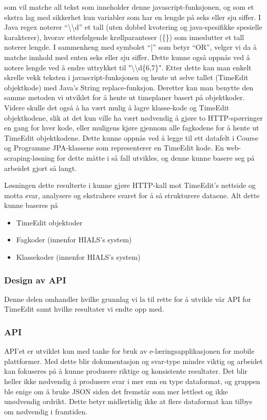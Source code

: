 \documentclass[../main.tex]{subfiles}
\begin{document}
som vil matche all tekst som inneholder denne javascript-funksjonen, og som et ekstra lag med sikkerhet kun variabler som har en lengde på seks eller sju siffer. I Java regex noterer “\textbackslash \textbackslash d” et tall (uten dobbel kvotering og java-spesifikke spesielle karakterer), hvorav etterfølgende krøllparanteser (\{\}) som inneslutter et tall noterer lengde. I sammenheng med symbolet “|” som betyr “OR”, velger vi da å matche innhold med enten seks eller sju siffer. Dette kunne også oppnås ved å notere lengde ved å endre uttrykket til "\textbackslash \textbackslash d\{6,7\}". \newline
Etter dette kan man enkelt skrelle vekk teksten i javascript-funksjonen og hente ut selve tallet (TimeEdit objektkode) med Java’s String replace-funksjon.
Deretter kan man benytte den samme metoden vi utviklet for å hente ut timeplaner basert på objektkoder. Videre skulle det også å ha vært mulig å lagre klasse-kode og TimeEdit objektkodene, slik at det kun ville ha vært nødvendig å gjøre to HTTP-spørringer en gang for hver kode, eller muligens kjøre gjennom alle fagkodene for å hente ut TimeEdit objektkodene. Dette kunne oppnås ved å legge til ett datafelt i Course og Programme JPA-klassene som representerer en TimeEdit kode. En web-scraping-løsning for dette måtte i så fall utvikles, og denne kunne basere seg på arbeidet gjort så langt.\newline

Løsningen dette resulterte i kunne gjøre HTTP-kall mot TimeEdit's nettside og motta svar, analysere og ekstrahere svaret for å så strukturere dataene. Alt dette kunne baseres på 
\begin{itemize}
\item TimeEdit objektoder
\item Fagkoder (innenfor HIALS's system)
\item Klassekoder (innenfor HIALS's system)
\end{itemize}

\newpage

\subsubsection{Design av API}
Denne delen omhandler hvilke grunnlag vi la til rette for å utvikle vår API for TimeEdit samt hvilke resultater vi endte opp med.

\subsubsection{API}
API’et er utviklet kun med tanke for bruk av e-læringsapplikasjonen for mobile plattformer. Med dette blir dokumentasjon og svar-type mindre viktig og arbeidet kan fokuseres på å kunne produsere riktige og konsistente resultater. Det blir heller ikke nødvendig å produsere svar i mer enn en type dataformat, og gruppen ble enige om å bruke JSON siden det fremstår som mer lettlest og ikke unødvendig ordrikt. Dette betyr midlertidig ikke at flere dataformat kan tilbys om nødvendig i framtiden.
\end{document}
